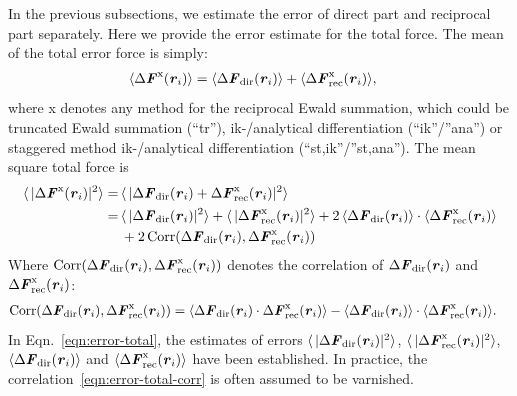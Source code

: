 \documentclass[aps,pre,preprint]{revtex4}
\renewcommand{\v}[1]{\textbf{\textit{#1}}}
\begin{document}
In the previous subsections, we estimate the error of direct part and
reciprocal part separately. Here we provide the error estimate for the
total force. The mean of the total error force is simply:
\begin{align}
  \langle\Delta\v F^{\textrm{x}}(\v r_i) \rangle
  &=
  \langle\Delta\v F_{\textrm{dir}}(\v r_i) \rangle +
  \langle\Delta\v F^{\textrm{x}}_{\textrm{rec}}(\v r_i) \rangle,
\end{align}
where \textrm{x}
denotes any method for the reciprocal Ewald summation, which
could be truncated Ewald summation (``tr''), ik-/analytical differentiation
(``ik''/''ana'') or staggered method
ik-/analytical differentiation (``st,ik''/''st,ana'').
The mean square total force is
\begin{align}\nonumber
  \langle\,\vert\Delta\v F^{\textrm{x}}(\v r_i)\vert^2\rangle
  = \,&
  \langle\,\vert
  \Delta\v F_{\textrm{dir}}(\v r_i) + \Delta\v F^{\textrm{x}}_{\textrm{rec}}(\v r_i) 
  \vert^2 \rangle \\\nonumber
  = \,&
  \langle\,\vert\Delta\v F_{\textrm{dir}}(\v r_i)\vert^2\rangle +
  \langle\,\vert\Delta\v F^{\textrm{x}}_{\textrm{rec}}(\v r_i)\vert^2\rangle +
  2\,\langle\Delta\v F_{\textrm{dir}}(\v r_i)\rangle
  \cdot \langle\Delta\v F^{\textrm{x}}_{\textrm{rec}}(\v r_i)\rangle \\
  \label{eqn:error-total}
  &
  + 2\,\textrm{Corr}(\Delta\v F_{\textrm{dir}}(\v r_i),
  \Delta\v F^{\textrm{x}}_{\textrm{rec}}(\v r_i))
\end{align}
Where $ \textrm{Corr}(\Delta\v F_{\textrm{dir}}(\v r_i), \Delta\v
F^{\textrm{x}}_{\textrm{rec}}(\v r_i))$ denotes the correlation of
$\Delta\v F_{\textrm{dir}}(\v r_i)$ and $\Delta\v
F^{\textrm{x}}_{\textrm{rec}}(\v r_i)$:
\begin{align}\label{eqn:error-total-corr}
  \textrm{Corr}(\Delta\v F_{\textrm{dir}}(\v r_i),
  \Delta\v F^{\textrm{x}}_{\textrm{rec}}(\v r_i))
  & =
  \langle
  \Delta\v F_{\textrm{dir}}(\v r_i)\cdot
  \Delta\v F^{\textrm{x}}_{\textrm{rec}}(\v r_i)
  \rangle -
  \langle
  \Delta\v F_{\textrm{dir}}(\v r_i)
  \rangle\cdot
  \langle
  \Delta\v F^{\textrm{x}}_{\textrm{rec}}(\v r_i)
  \rangle.
\end{align}
In Eqn.~\eqref{eqn:error-total}, the estimates of errors
$\langle\,\vert\Delta\v F_{\textrm{dir}}(\v r_i)\vert^2\rangle $,
$\langle\,\vert\Delta\v F^{\textrm{x}}_{\textrm{rec}}(\v
r_i)\vert^2\rangle $, $\langle\Delta\v F_{\textrm{dir}}(\v
r_i)\rangle$ and $\langle\Delta\v F^{\textrm{x}}_{\textrm{rec}}(\v
r_i)\rangle $ have been established.
In practice, the correlation~\eqref{eqn:error-total-corr}
is often assumed to be varnished.
\end{document}
